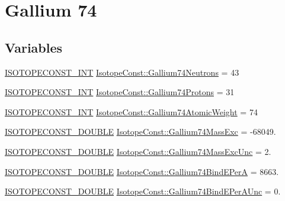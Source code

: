 \hypertarget{group___isotope_const-_gallium-_ga74}{}\section{Gallium 74}
\label{group___isotope_const-_gallium-_ga74}
\subsection*{Variables}
\begin{DoxyCompactItemize}
\item 
\mbox{\hyperlink{group___isotope_const-_macros_ga5f18360b3e99483a35c32d789e62621c}{I\+S\+O\+T\+O\+P\+E\+C\+O\+N\+S\+T\+\_\+\+I\+NT}} \mbox{\hyperlink{group___isotope_const-_gallium-_ga74_ga3b70a997751fb862c739a21072a210a9}{Isotope\+Const\+::\+Gallium74\+Neutrons}} = 43
\item 
\mbox{\hyperlink{group___isotope_const-_macros_ga5f18360b3e99483a35c32d789e62621c}{I\+S\+O\+T\+O\+P\+E\+C\+O\+N\+S\+T\+\_\+\+I\+NT}} \mbox{\hyperlink{group___isotope_const-_gallium-_ga74_ga9be44783bcfaef512b002ed97303b619}{Isotope\+Const\+::\+Gallium74\+Protons}} = 31
\item 
\mbox{\hyperlink{group___isotope_const-_macros_ga5f18360b3e99483a35c32d789e62621c}{I\+S\+O\+T\+O\+P\+E\+C\+O\+N\+S\+T\+\_\+\+I\+NT}} \mbox{\hyperlink{group___isotope_const-_gallium-_ga74_gac7ca69056e1a7c8c61664c46225fe888}{Isotope\+Const\+::\+Gallium74\+Atomic\+Weight}} = 74
\item 
\mbox{\hyperlink{group___isotope_const-_macros_ga8f45a7272ce02c0b4c65c44636ed719a}{I\+S\+O\+T\+O\+P\+E\+C\+O\+N\+S\+T\+\_\+\+D\+O\+U\+B\+LE}} \mbox{\hyperlink{group___isotope_const-_gallium-_ga74_ga122f894e78dc1d59b74c7e297f9aa6c6}{Isotope\+Const\+::\+Gallium74\+Mass\+Exc}} = -\/68049.
\item 
\mbox{\hyperlink{group___isotope_const-_macros_ga8f45a7272ce02c0b4c65c44636ed719a}{I\+S\+O\+T\+O\+P\+E\+C\+O\+N\+S\+T\+\_\+\+D\+O\+U\+B\+LE}} \mbox{\hyperlink{group___isotope_const-_gallium-_ga74_ga1e6de6b64efa98208f0dce5136bff1e8}{Isotope\+Const\+::\+Gallium74\+Mass\+Exc\+Unc}} = 2.
\item 
\mbox{\hyperlink{group___isotope_const-_macros_ga8f45a7272ce02c0b4c65c44636ed719a}{I\+S\+O\+T\+O\+P\+E\+C\+O\+N\+S\+T\+\_\+\+D\+O\+U\+B\+LE}} \mbox{\hyperlink{group___isotope_const-_gallium-_ga74_gac5de04cbe03961bf04b3c1a0cc9c8fef}{Isotope\+Const\+::\+Gallium74\+Bind\+E\+PerA}} = 8663.
\item 
\mbox{\hyperlink{group___isotope_const-_macros_ga8f45a7272ce02c0b4c65c44636ed719a}{I\+S\+O\+T\+O\+P\+E\+C\+O\+N\+S\+T\+\_\+\+D\+O\+U\+B\+LE}} \mbox{\hyperlink{group___isotope_const-_gallium-_ga74_ga9b82d7269a7ff8088937686b723cb2a9}{Isotope\+Const\+::\+Gallium74\+Bind\+E\+Per\+A\+Unc}} = 0.

\end{DoxyCompactItemize}
